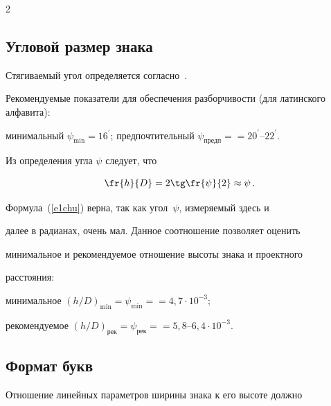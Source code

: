 \begin{multicols}{2}
\subsection{Угловой размер знака} %





     Стягиваемый угол определяется согласно~\cite{10chu, 15chu}. 


Рекомендуемые показатели для обеспечения разборчивости (для латинского алфавита):


минимальный $\psi_{\min} =16^\prime$; предпочтительный $\psi_{\mathrm{предп}}=$\linebreak $=20^\prime\mbox{--}22^\prime$.





     Из определения угла $\psi$ следует, что


     \begin{equation}


     \fr{h}{D}=2\tg\fr{\psi}{2}\approx \psi\,.


     \label{e1chu}


     \end{equation}


     


     Формула~(\ref{e1chu}) верна, так как угол~$\psi$, измеряемый здесь и 


далее в радианах, очень мал. Данное соотношение позволяет оценить 


минимальное и рекомендуемое отношение высоты знака и проектного 


расстояния:


минимальное $(h/D)_{\min}=\psi_{\min}=$\linebreak $= 4{,}7\cdot 10^{-3}$;


рекомендуемое $(h/D)_{\mathrm{рек}}=\psi_{\mathrm{рек}}=$\linebreak $= 5{,}8\mbox{--}6{,}4\cdot 10^{-3}$.





\subsection{Формат букв} %





     Отношение линейных параметров ширины знака к его высоте должно 



\end{multicols}
